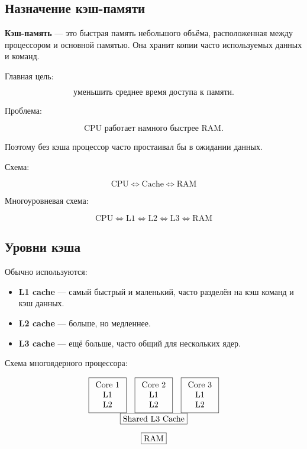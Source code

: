 \documentclass[12pt,a4paper]{article}
\theoremstyle{remark}
\begin{document}
\subsection{Назначение кэш-памяти}

\textbf{Кэш-память} --- это быстрая память небольшого объёма, расположенная между процессором и основной памятью. Она хранит копии часто используемых данных и команд.

Главная цель:

\[
\text{уменьшить среднее время доступа к памяти}.
\]

Проблема:

\[
\text{CPU работает намного быстрее RAM}.
\]

Поэтому без кэша процессор часто простаивал бы в ожидании данных.

Схема:

\[
\boxed{\text{CPU}}
\Longleftrightarrow
\boxed{\text{Cache}}
\Longleftrightarrow
\boxed{\text{RAM}}
\]

Многоуровневая схема:

\[
\boxed{\text{CPU}}
\Longleftrightarrow
\boxed{\text{L1}}
\Longleftrightarrow
\boxed{\text{L2}}
\Longleftrightarrow
\boxed{\text{L3}}
\Longleftrightarrow
\boxed{\text{RAM}}
\]

\subsection{Уровни кэша}

Обычно используются:

\begin{itemize}
    \item \textbf{L1 cache} --- самый быстрый и маленький, часто разделён на кэш команд и кэш данных.
    \item \textbf{L2 cache} --- больше, но медленнее.
    \item \textbf{L3 cache} --- ещё больше, часто общий для нескольких ядер.
\end{itemize}

Схема многоядерного процессора:

\[
\begin{array}{ccc}
\boxed{
\begin{array}{c}
\text{Core 1}\\
\text{L1}\\
\text{L2}
\end{array}}
&
\boxed{
\begin{array}{c}
\text{Core 2}\\
\text{L1}\\
\text{L2}
\end{array}}
&
\boxed{
\begin{array}{c}
\text{Core 3}\\
\text{L1}\\
\text{L2}
\end{array}}
\\[1em]
\multicolumn{3}{c}{
\boxed{\text{Shared L3 Cache}}
}
\\[1em]
\multicolumn{3}{c}{
\boxed{\text{RAM}}
}
\end{array}
\]
\end{document}
